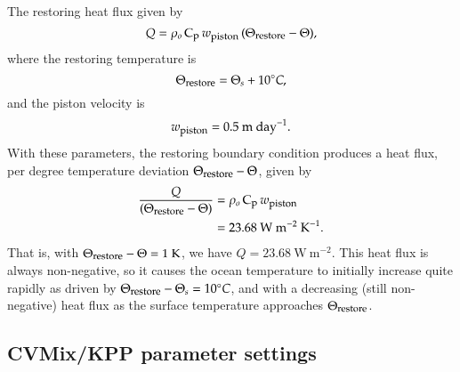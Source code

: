 \begin{itemize}
  The restoring heat flux given by
\begin{equation}
 Q =  \rho_o \, \mbox{C}_{\mbox{\footnotesize p}} \, w_{\mbox{\footnotesize piston}} \, (\Theta_{\mbox{\footnotesize restore}}  - \Theta),
\label{eq:heat-flux-restoring}
\end{equation}
 where the restoring temperature is 
\begin{equation}
\Theta_{\mbox{\footnotesize restore}}  = \Theta_s + 10^{\circ}C,
\label{eq:restoring-temp}
\end{equation}
 and the piston velocity is 
\begin{equation}
  w_{\mbox{\footnotesize piston}} = 0.5~\mbox{m}~\mbox{day}^{-1}. 
\end{equation}
With these parameters, the restoring boundary condition produces a
heat flux, per degree temperature deviation
$\Theta_{\mbox{\footnotesize restore}} - \Theta$, given by
\begin{subequations}
\begin{align}
 \frac{Q}{(\Theta_{\mbox{\footnotesize restore}} - \Theta )} &= \rho_o \, \mbox{C}_{\mbox{\footnotesize p}} \, w_{\mbox{\footnotesize piston}}
 \\
 &= 23.68~\mbox{W}~\mbox{m}^{-2}~\mbox{K}^{-1}.  
\end{align}
\end{subequations}
That is, with $\Theta_{\mbox{\footnotesize restore}} - \Theta =
1~\mbox{K}$, we have $Q = 23.68~\mbox{W}~\mbox{m}^{-2}$.  This heat
flux is always non-negative, so it causes the ocean temperature to
initially increase quite rapidly as driven by
$\Theta_{\mbox{\footnotesize restore}} - \Theta_s = 10^{\circ}C$, and
with a decreasing (still non-negative) heat flux as the surface
temperature approaches $\Theta_{\mbox{\footnotesize restore}}$.  

\end{itemize}



\subsection{CVMix/KPP parameter settings}

